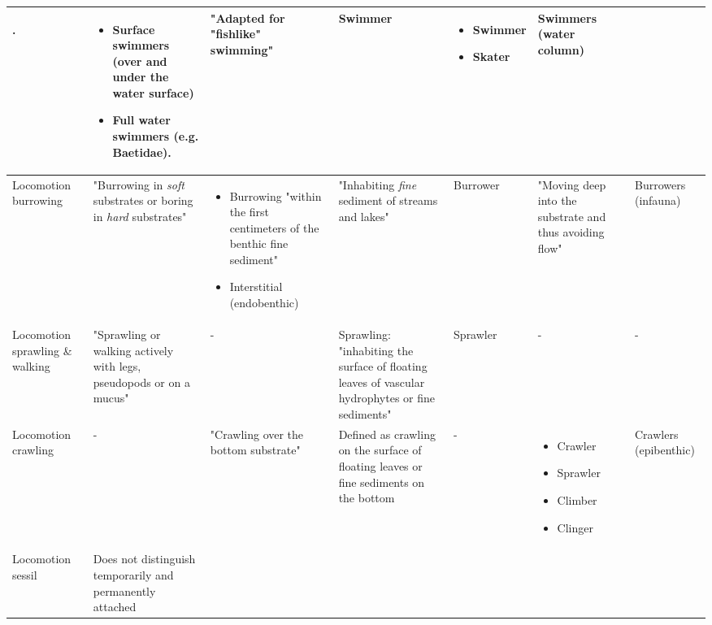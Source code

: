 \documentclass[12pt]{article}
\begin{document}
\begin{landscape}
\begin{longtable}{m{2cm}|m{3.25cm}|m{3.2cm}|m{3.1cm}|m{2.9cm}|m{3.4cm}|m{2.4cm}}
\begin{itemize}
        \end{itemize}. &
        \begin{itemize}
            \item Surface swimmers (over and under the water surface)
            \item Full water swimmers (e.g. Baetidae).
        \end{itemize} & 
        "Adapted for "fishlike" swimming" & 
        Swimmer & 
        \begin{itemize}
            \item Swimmer
            \item Skater
        \end{itemize} & 
        Swimmers (water column)
        \\
        \midrule
        Locomotion burrowing & 
        "Burrowing in \textit{soft} substrates or boring in \textit{hard} substrates" & 
        \begin{itemize}
            \item Burrowing "within the first centimeters of the benthic fine sediment"
            \item Interstitial (endobenthic)
        \end{itemize} & 
        "Inhabiting \textit{fine} sediment of streams and lakes" &
        Burrower & 
        "Moving deep into the substrate and thus avoiding flow" &
        Burrowers (infauna)
        \\
        \midrule
        Locomotion sprawling \& walking & 
        "Sprawling or walking actively with legs, pseudopods or on a mucus" &
        - & 
        Sprawling: "inhabiting the surface of floating leaves of vascular hydrophytes or fine sediments" & 
        Sprawler &
        - & 
        - \\
        \midrule
        Locomotion crawling & 
        - &
        "Crawling over the bottom substrate" & 
        Defined as crawling on the surface of floating leaves or fine sediments on the bottom & 
        - & 
        \begin{itemize}
            \item Crawler
            \item Sprawler
            \item Climber
            \item Clinger
        \end{itemize} &
        Crawlers (epibenthic) \\
        \midrule
        Locomotion sessil & 
        Does not distinguish temporarily and permanently attached & 

\end{longtable}
\end{landscape}
\end{document}
